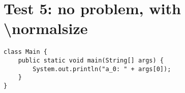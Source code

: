 \documentclass{tudapub}
\begin{document}
\section{Test 5: no problem, with \textbackslash normalsize}
\begin{verbatim}
class Main {
    public static void main(String[] args) {
        System.out.println("a_0: " + args[0]);
    }
}
\end{verbatim}
\end{document}
